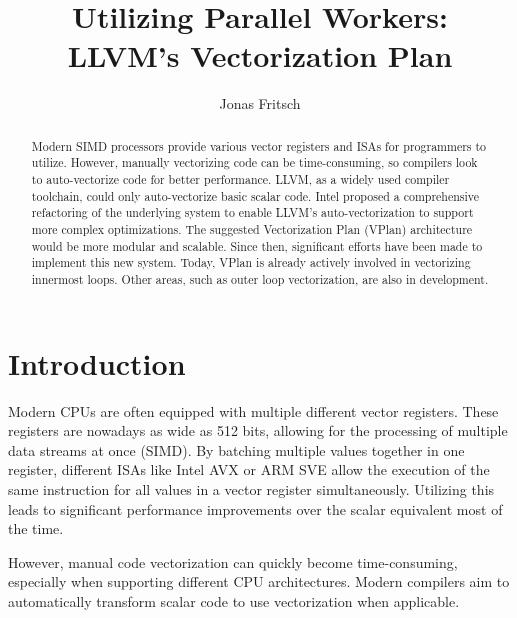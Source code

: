 \documentclass[sigplan,11pt,nonacm]{acmart}
\begin{document}
\title{Utilizing Parallel Workers: \\LLVM's Vectorization Plan}
\author{Jonas Fritsch}

\begin{abstract}
  Modern SIMD processors provide various vector registers and ISAs for programmers to utilize. 
  However, manually vectorizing code can be time-consuming, so compilers look to auto-vectorize 
  code for better performance. LLVM, as a widely used compiler toolchain, could only auto-vectorize 
  basic scalar code. Intel proposed a comprehensive refactoring of the underlying system to enable 
  LLVM's auto-vectorization to support more complex optimizations. The suggested Vectorization Plan 
  (VPlan) architecture would be more modular and scalable. Since then, significant efforts have been 
  made to implement this new system. Today, VPlan is already actively involved in vectorizing 
  innermost loops. Other areas, such as outer loop vectorization, are also in development.
\end{abstract}

\maketitle



\section{Introduction}
\label{sec:introduction}
Modern CPUs are often equipped with multiple different vector registers. These registers are nowadays 
as wide as 512 bits, allowing for the processing of multiple data streams at once (SIMD). By 
batching multiple values together in one register, different ISAs like Intel AVX or ARM SVE allow 
the execution of the same instruction for all values in a vector register simultaneously. 
Utilizing this leads to significant performance improvements over the scalar equivalent most of 
the time.

However, manual code vectorization can quickly become time-consuming, especially when
supporting different CPU architectures. Modern compilers aim to automatically transform scalar code
to use vectorization when applicable.
\end{document}
